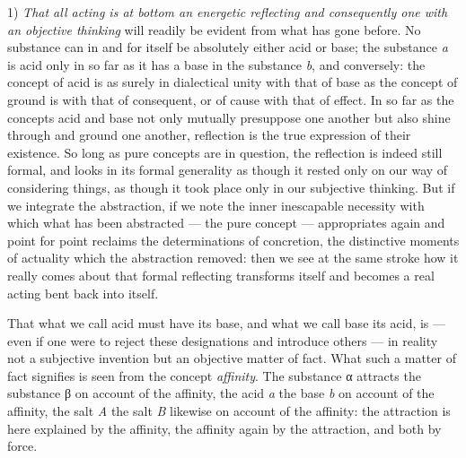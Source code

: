 \documentclass[12pt,a4paper]{book}
\begin{document}
1) \emph{That all acting is at bottom an energetic reflecting and consequently
one with an objective thinking} will readily be evident from what has gone
before. No substance can in and for itself be absolutely either acid or base;
the substance \textit{a} is acid only in so far as it has a base in the
substance \textit{b}, and conversely: the concept of acid is as surely in
dialectical unity with that of base as the concept of ground is with that of
consequent, or of cause with that of effect. In so far as the concepts acid and
base not only mutually presuppose one another but also shine through and ground
one another, reflection is the true expression of their existence. So long as
pure concepts are in question, the reflection is indeed still formal, and looks
in its formal generality as though it rested only on our way of considering
things, as though it took place only in our subjective thinking. But if we
integrate the abstraction, if we note the inner inescapable necessity with
which what has been abstracted --- the pure concept --- appropriates again and
point for point reclaims the determinations of concretion, the distinctive
moments of actuality which the abstraction removed: then we see at the same
stroke how it really comes about that formal reflecting transforms itself and
becomes a real acting bent back into itself.

That what we call acid must have its base, and what we call base its acid, is
--- even if one were to reject
these designations and introduce others --- in reality not a subjective
invention but an objective matter of fact. What such a matter of fact signifies
is seen from the concept \emph{affinity}. The substance α attracts the
substance β on account of the affinity, the acid \textit{a} the base \textit{b}
on account of the affinity, the salt \textit{A} the salt \textit{B} likewise on
account of the affinity: the attraction is here explained by the affinity, the
affinity again by the attraction, and both by force.
\end{document}
